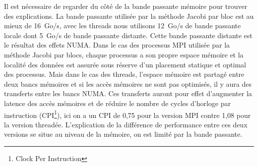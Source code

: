 Il est nécessaire de regarder du côté de la bande passante mémoire pour trouver des explications.
%
La bande passante utilisée par la méthode Jacobi par bloc est au mieux de 16~Go/s, avec les threads nous utilisons 12~Go/s de bande passante locale dont 5~Go/s de bande passante distante.
%
Cette bande passante distante est le résultat des effets NUMA.
%
Dans le cas des processus MPI utilisée par la méthode Jacobi par blocs, chaque processus a son propre espace mémoire et la localité des données est assurée sous réserve d'un placement statique et optimal des processus.
%
Mais dans le cas des threads, l'espace mémoire est partagé entre deux bancs mémoires et si les accès mémoires ne sont pas optimisés, il y aura des transferts entre les bancs NUMA.
%
Ces transferts auront pour effet d'augmenter la latence des accès mémoires et de réduire le nombre de cycles d'horloge par instruction (CPI\footnote{Clock Per Instruction}), ici on a un CPI de 0,75 pour la version MPI contre 1,08 pour la version threadée.
%
L'explication de la différence de performance entre ces deux versions se situe au niveau de la mémoire, on est limité par la bande passante.

